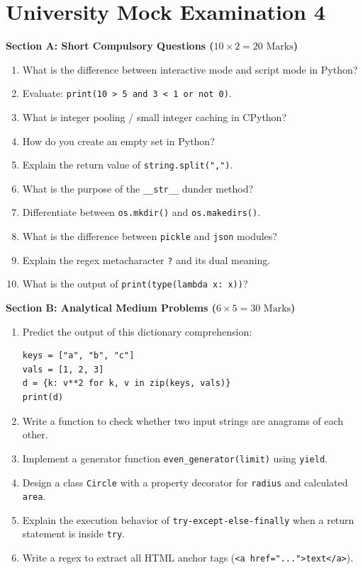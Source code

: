 \section{University Mock Examination 4}

\begin{mockexam}
\noindent\textbf{Section A: Short Compulsory Questions ($10 \times 2 = 20\text{ Marks}$)}
\begin{enumerate}[leftmargin=1.5em]
    \item What is the difference between interactive mode and script mode in Python?
    \item Evaluate: \texttt{print(10 > 5 and 3 < 1 or not 0)}.
    \item What is integer pooling / small integer caching in CPython?
    \item How do you create an empty set in Python?
    \item Explain the return value of \texttt{string.split(",")}.
    \item What is the purpose of the \texttt{\_\_str\_\_} dunder method?
    \item Differentiate between \texttt{os.mkdir()} and \texttt{os.makedirs()}.
    \item What is the difference between \texttt{pickle} and \texttt{json} modules?
    \item Explain the regex metacharacter \texttt{?} and its dual meaning.
    \item What is the output of \texttt{print(type(lambda x: x))}?
\end{enumerate}

\medskip
\noindent\textbf{Section B: Analytical Medium Problems ($6 \times 5 = 30\text{ Marks}$)}
\begin{enumerate}[leftmargin=1.5em, start=11]
    \item Predict the output of this dictionary comprehension:
    \begin{lstlisting}[language=Python3]
keys = ["a", "b", "c"]
vals = [1, 2, 3]
d = {k: v**2 for k, v in zip(keys, vals)}
print(d)
    \end{lstlisting}
    \item Write a function to check whether two input strings are anagrams of each other.
    \item Implement a generator function \texttt{even\_generator(limit)} using \texttt{yield}.
    \item Design a class \texttt{Circle} with a property decorator for \texttt{radius} and calculated \texttt{area}.
    \item Explain the execution behavior of \texttt{try-except-else-finally} when a return statement is inside \texttt{try}.
    \item Write a regex to extract all HTML anchor tags (\texttt{<a href="...">text</a>}).
\end{enumerate}


\end{mockexam}
